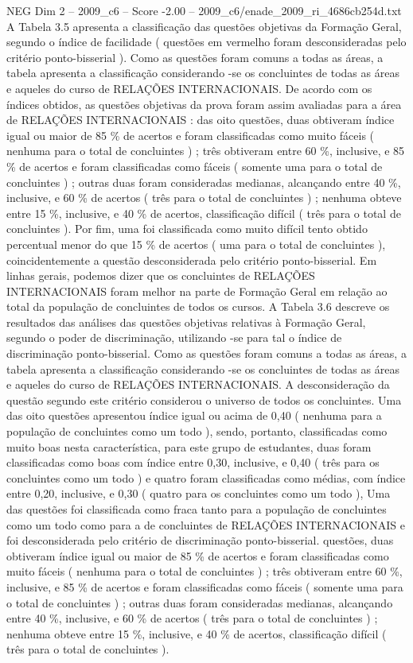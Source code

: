 \begin{textsample}{NEG Dim 2 – 2009\_c6 – Score -2.00 – 2009\_c6/enade\_2009\_ri\_4686cb254d.txt}
A Tabela 3.5 apresenta a classificação das questões objetivas da Formação Geral, segundo o índice de facilidade ( questões em vermelho foram desconsideradas pelo critério ponto-bisserial ).
Como as questões foram comuns a todas as áreas, a tabela apresenta a classificação considerando -se os concluintes de todas as áreas e aqueles do curso de RELAÇÕES INTERNACIONAIS.
De acordo com os índices obtidos, as questões objetivas da prova foram assim avaliadas para a área de RELAÇÕES INTERNACIONAIS : das oito questões, duas obtiveram índice igual ou maior de 85 \% de acertos e foram classificadas como muito fáceis ( nenhuma para o total de concluintes ) ; três obtiveram entre 60 \%, inclusive, e 85 \% de acertos e foram classificadas como fáceis ( somente uma para o total de concluintes ) ; outras duas foram consideradas medianas, alcançando entre 40 \%, inclusive, e 60 \% de acertos ( três para o total de concluintes ) ; nenhuma obteve entre 15 \%, inclusive, e 40 \% de acertos, classificação difícil ( três para o total de concluintes ).
Por fim, uma foi classificada como muito difícil tento obtido percentual menor do que 15 \% de acertos ( uma para o total de concluintes ), coincidentemente a questão desconsiderada pelo critério ponto-bisserial.
Em linhas gerais, podemos dizer que os concluintes de RELAÇÕES INTERNACIONAIS foram melhor na parte de Formação Geral em relação ao total da população de concluintes de todos os cursos.
A Tabela 3.6 descreve os resultados das análises das questões objetivas relativas à Formação Geral, segundo o poder de discriminação, utilizando -se para tal o índice de discriminação ponto-bisserial.
Como as questões foram comuns a todas as áreas, a tabela apresenta a classificação considerando -se os concluintes de todas as áreas e aqueles do curso de RELAÇÕES INTERNACIONAIS.
A desconsideração da questão segundo este critério considerou o universo de todos os concluintes.
Uma das oito questões apresentou índice igual ou acima de 0,40 ( nenhuma para a população de concluintes como um todo ), sendo, portanto, classificadas como muito boas nesta característica, para este grupo de estudantes, duas foram classificadas como boas com índice entre 0,30, inclusive, e 0,40 ( três para os concluintes como um todo ) e quatro foram classificadas como médias, com índice entre 0,20, inclusive, e 0,30 ( quatro para os concluintes como um todo ), Uma das questões foi classificada como fraca tanto para a população de concluintes como um todo como para a de concluintes de RELAÇÕES INTERNACIONAIS e foi desconsiderada pelo critério de discriminação ponto-bisserial. questões, duas obtiveram índice igual ou maior de 85 \% de acertos e foram classificadas como muito fáceis ( nenhuma para o total de concluintes ) ; três obtiveram entre 60 \%, inclusive, e 85 \% de acertos e foram classificadas como fáceis ( somente uma para o total de concluintes ) ; outras duas foram consideradas medianas, alcançando entre 40 \%, inclusive, e 60 \% de acertos ( três para o total de concluintes ) ; nenhuma obteve entre 15 \%, inclusive, e 40 \% de acertos, classificação difícil ( três para o total de concluintes ).

\end{textsample}
